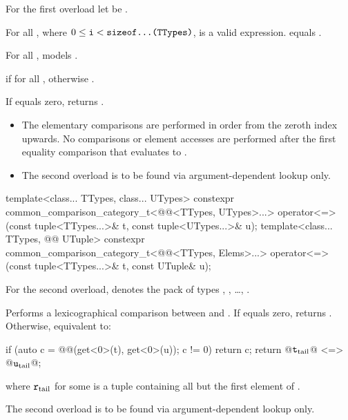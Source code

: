 \begin{itemdescr}
\pnum
For the first overload let  be .

\pnum
\mandates
For all ,
where $0 \leq \texttt{i} < \texttt{sizeof...(TTypes)}$,
 is a valid expression.
 equals
.

\pnum
\expects
For all ,  models
.

\pnum
\returns
{} if  for all
, otherwise .
\begin{note}
If  equals zero, returns .
\end{note}

\pnum
\remarks
\begin{itemize}
\item
The elementary comparisons are performed in order from the
zeroth index upwards.  No comparisons or element accesses are
performed after the first equality comparison that evaluates to
.
\item
The second overload is to be found via argument-dependent lookup only.
\end{itemize}
\end{itemdescr}

%
\begin{itemdecl}
template<class... TTypes, class... UTypes>
  constexpr common_comparison_category_t<@@<TTypes, UTypes>...>
    operator<=>(const tuple<TTypes...>& t, const tuple<UTypes...>& u);
template<class... TTypes, @@ UTuple>
  constexpr common_comparison_category_t<@@<TTypes, Elems>...>
    operator<=>(const tuple<TTypes...>& t, const UTuple& u);
\end{itemdecl}

\begin{itemdescr}
\pnum
For the second overload,  denotes the pack of types
,
, \ldots,
.

\pnum
\effects
Performs a lexicographical comparison between  and .
If  equals zero,
returns .
Otherwise, equivalent to:
\begin{codeblock}
if (auto c = @@(get<0>(t), get<0>(u)); c != 0) return c;
return @$\texttt{t}_\mathrm{tail}$@ <=> @$\texttt{u}_\mathrm{tail}$@;
\end{codeblock}
where $\texttt{r}_\mathrm{tail}$ for some 
is a tuple containing all but the first element of .

\pnum
\remarks
The second overload is to be found via argument-dependent lookup only.
\end{itemdescr}

